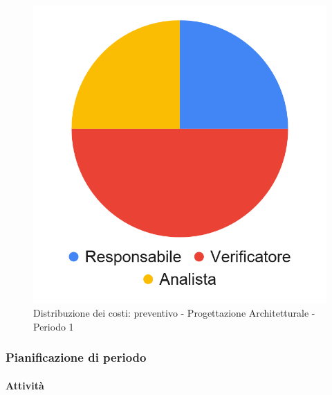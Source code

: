 \hspace{-1cm}
\begin{minipage}{.50\textwidth}
\smallPreventivoTable{
	
}
\end{minipage}
\hspace{1cm}
\begin{minipage}{.40\textwidth}
\begin{figure}[H]
	\includegraphics[scale=0.21]{res/images/charts/preventivo_priori/Grafico4-3.png}
	\caption{Distribuzione dei costi: preventivo - Progettazione Architetturale - Periodo 1}
\end{figure}
\end{minipage} 






\subsubsection{Pianificazione di periodo}


\paragraph{Attività}
\subparagraph*{}


